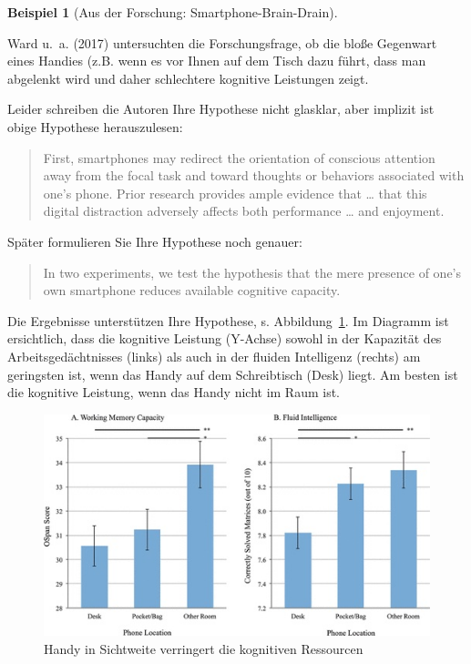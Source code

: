 \documentclass[
  a4paper,
  DIV=11]{scrreprt}
\theoremstyle{definition}
\theoremstyle{definition}
\newtheorem{example}{Beispiel}[chapter]
\theoremstyle{remark}
\begin{document}
\leavevmode{}%
\begin{example}[Aus der Forschung:
Smartphone-Brain-Drain]\label{exm-braindrain}

Ward u.~a. (2017) untersuchten die Forschungsfrage, ob die bloße
Gegenwart eines Handies (z.B. wenn es vor Ihnen auf dem Tisch dazu
führt, dass man abgelenkt wird und daher schlechtere kognitive
Leistungen zeigt.

Leider schreiben die Autoren Ihre Hypothese nicht glasklar, aber
implizit ist obige Hypothese herauszulesen:

\begin{quote}
First, smartphones may redirect the orientation of conscious attention
away from the focal task and toward thoughts or behaviors associated
with one's phone. Prior research provides ample evidence that \ldots{}
that this digital distraction adversely affects both performance
\ldots{} and enjoyment.
\end{quote}

Später formulieren Sie Ihre Hypothese noch genauer:

\begin{quote}
In two experiments, we test the hypothesis that the mere presence of
one's own smartphone reduces available cognitive capacity.
\end{quote}

Die Ergebnisse unterstützen Ihre Hypothese, s.
Abbildung~\ref{fig-braindrain}. Im Diagramm ist ersichtlich, dass die
kognitive Leistung (Y-Achse) sowohl in der Kapazität des
Arbeitsgedächtnisses (links) als auch in der fluiden Intelligenz
(rechts) am geringsten ist, wenn das Handy auf dem Schreibtisch (Desk)
liegt. Am besten ist die kognitive Leistung, wenn das Handy nicht im
Raum ist.

\begin{figure}

{\centering \includegraphics{./img/braindrain1.jpg}

}

\caption{\label{fig-braindrain}Handy in Sichtweite verringert die
kognitiven Ressourcen}

\end{figure}

\end{example}
\end{document}
